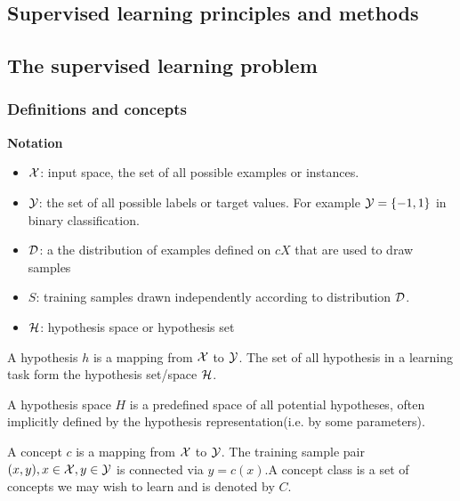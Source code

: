 \begin{refsection}
	\startcontents[chapters]	
\chapter{Supervised learning principles and methods}\label{ch:statistical-learning}
\section{The supervised learning problem}


\subsection{Definitions and concepts}

\begin{mdframed}
	\textbf{Notation}\cite[12]{mohri2012foundations}
	\begin{itemize}
		\item $\mathcal{X}$: input space, the set of all possible examples or instances.
		\item $\mathcal{Y}$: the set of all possible labels or target values. For example $\mathcal{Y}=\{-1,1\}$ in binary classification.
		\item $\mathcal{D}$: a the distribution of examples defined on $cX$ that are used to draw samples
		\item $S$: training samples drawn independently according to distribution $\mathcal{D}$.  
		\item $\mathcal{H}$: hypothesis space or hypothesis set
	\end{itemize}
\end{mdframed}


\begin{definition}
A hypothesis $h$ is a mapping from $\mathcal{X}$ to $\mathcal{Y}$. The set of all hypothesis in a learning task form the hypothesis set/space $\mathcal{H}$.
\end{definition}

\begin{definition}
\cite{mitchell1997machine}A hypothesis space $H$ is a predefined space of all potential hypotheses, often implicitly defined by the hypothesis representation(i.e. by some parameters).  
\end{definition}


\begin{definition}
\cite[12]{mohri2012foundations}A concept $c$ is a mapping from $\mathcal{X}$ to $\mathcal{Y}$. The training sample pair $(x,y),x\in \mathcal{X},y\in \mathcal{Y}$ is connected via $y = c(x)$.A concept class is a set of concepts we may wish to learn and is denoted by $C$.
\end{definition}



\end{refsection}
